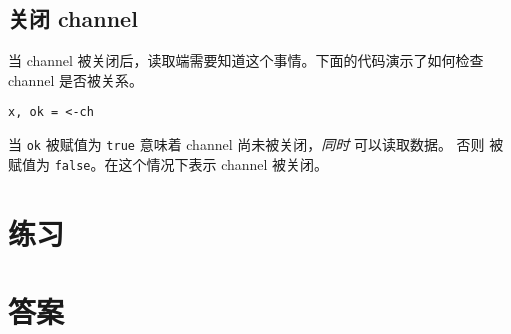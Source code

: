 \subsection{关闭 channel}
当 channel 被关闭后，读取端需要知道这个事情。下面的代码演示了如何检查 channel 是否被关系。
\begin{lstlisting}
x, ok = <-ch
\end{lstlisting}
当 \lstinline{ok} 被赋值为 \lstinline{true} 意味着 channel 尚未被关闭，\emph{同时} 可以读取数据。
否则  被赋值为 \lstinline{false}。在这个情况下表示 channel 被关闭。


\section{练习}




\cleardoublepage
\section{答案}
\shipoutAnswer
